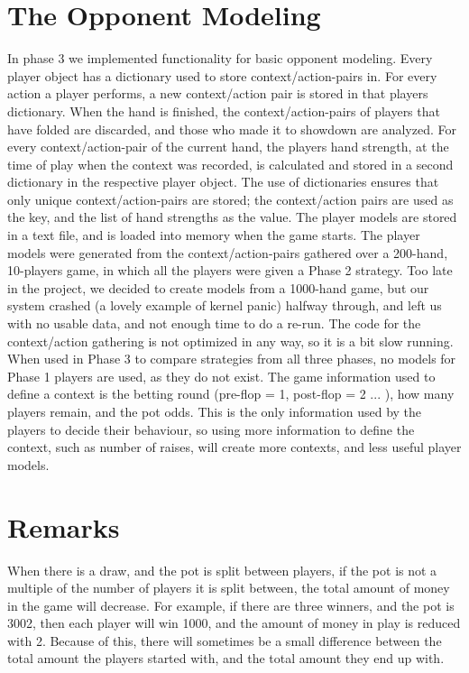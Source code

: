 \documentclass[titlepage]{article}
\begin{document}
\section{The Opponent Modeling}
    In phase 3 we implemented functionality for basic opponent modeling. Every player object has a dictionary used to store context/action-pairs in. For every action a player performs, a new context/action pair is stored in that players dictionary. When the hand is finished, the context/action-pairs of players that have folded are discarded, and those who made it to showdown are analyzed. For every context/action-pair of the current hand, the players hand strength, at the time of play when the context was recorded, is calculated and stored in a second dictionary in the respective player object. The use of dictionaries ensures that only unique context/action-pairs are stored; the context/action pairs are used as the key, and the list of hand strengths as the value. The player models are stored in a text file, and is loaded into memory when the game starts. The player models were generated from the context/action-pairs gathered over a 200-hand, 10-players game, in which all the players were given a Phase 2 strategy. Too late in the project, we decided to create models from a 1000-hand game, but our system crashed (a lovely example of kernel panic) halfway through, and left us with no usable data, and not enough time to do a re-run. The code for the context/action gathering is not optimized in any way, so it is a bit slow running. When used in Phase 3 to compare strategies from all three phases, no models for Phase 1 players are used, as they do not exist. The game information used to define a context is the betting round (pre-flop = 1, post-flop = 2 ... ), how many players remain, and the pot odds. This is the only information used by the players to decide their behaviour, so using more information to define the context, such as number of raises, will create more contexts, and less useful player models. 
		
\section{Remarks}
    When there is a draw, and the pot is split between players, if the pot is not a multiple of the number of players it is split between, the total amount of money in the game will decrease. For example, if there are three winners, and the pot is 3002, then each player will win 1000, and the amount of money in play is reduced with 2. Because of this, there will sometimes be a small difference between the total amount the players started with, and the total amount they end up with.
    		
\end{document}
